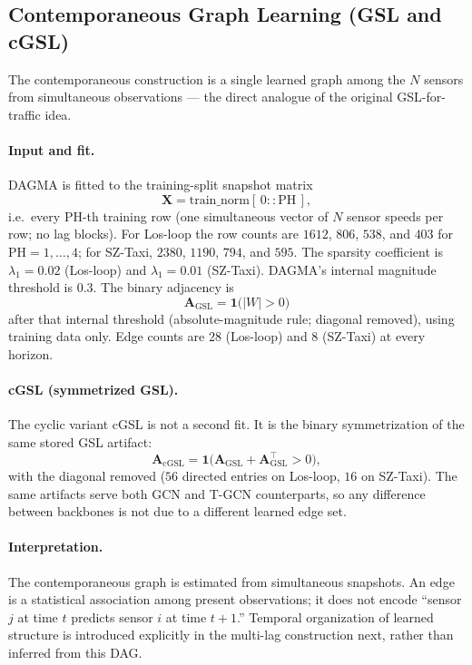 \subsection{Contemporaneous Graph Learning (GSL and cGSL)}\label{sec:gsl_contemp}

The contemporaneous construction is a single learned graph among the $N$
sensors from simultaneous observations --- the direct analogue of the
original GSL-for-traffic idea.

\paragraph{Input and fit.}
DAGMA is fitted to the training-split snapshot matrix
\[
\mathbf{X}=\mathrm{train\_norm}[\,0::\mathrm{PH}\,],
\]
i.e.\ every $\mathrm{PH}$-th training row (one simultaneous vector of $N$
sensor speeds per row; no lag blocks). For Los-loop the row counts are
$1612$, $806$, $538$, and $403$ for $\mathrm{PH}=1,\ldots,4$; for SZ-Taxi,
$2380$, $1190$, $794$, and $595$. The sparsity coefficient is
$\lambda_1=0.02$ (Los-loop) and $\lambda_1=0.01$ (SZ-Taxi). DAGMA's internal
magnitude threshold is $0.3$. The binary adjacency is
\[
\mathbf{A}_{\mathrm{GSL}}=\mathbf{1}\bigl(|W|>0\bigr)
\]
after that internal threshold (absolute-magnitude rule; diagonal removed),
using training data only. Edge counts are $28$ (Los-loop) and $8$ (SZ-Taxi)
at every horizon.

\paragraph{cGSL (symmetrized GSL).}
The cyclic variant cGSL is not a second fit. It is the binary symmetrization
of the same stored GSL artifact:
\begin{equation}\label{eq:cgsl}
\mathbf{A}_{\mathrm{cGSL}}
=\mathbf{1}\bigl(\mathbf{A}_{\mathrm{GSL}}+\mathbf{A}_{\mathrm{GSL}}^{\top}>0\bigr),
\end{equation}
with the diagonal removed ($56$ directed entries on Los-loop, $16$ on
SZ-Taxi). The same artifacts serve both GCN and T-GCN counterparts, so any
difference between backbones is not due to a different learned edge set.

\paragraph{Interpretation.}
The contemporaneous graph is estimated from simultaneous snapshots. An edge
is a statistical association among present observations; it does not encode
``sensor $j$ at time $t$ predicts sensor $i$ at time $t+1$.'' Temporal
organization of learned structure is introduced explicitly in the multi-lag
construction next, rather than inferred from this DAG.

